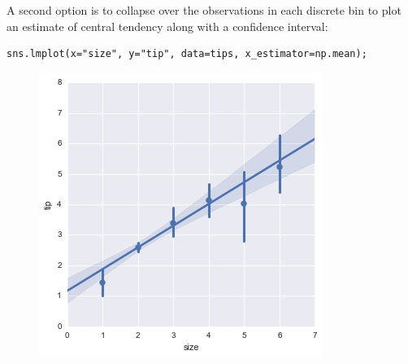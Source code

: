 \documentclass{beamer}
\begin{document}
\begin{frame}[fragile]
	\large
A second option is to collapse over the observations in each discrete bin to plot an estimate of central tendency along with a confidence interval:
\begin{verbatim}
sns.lmplot(x="size", y="tip", data=tips, x_estimator=np.mean);
\end{verbatim}

\begin{figure}
\centering
\includegraphics[width=0.7\linewidth]{images/regression_16_0}
\caption{}
\label{fig:regression_16_0}
\end{figure}


\end{frame}
\end{document}
